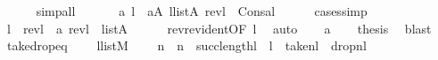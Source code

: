 \begin{isabellebody}
\ \ \ \ \isamarkupfalse%
\ simp{\isacharunderscore}{\kern0pt}all\isanewline
\ \ \isamarkupfalse%
\isanewline
\ \ \isamarkupfalse%
\ a\ l{\isacharprime}{\kern0pt}\ \ {\isachardoublequoteopen}a{\isasymin}A{\isachardoublequoteclose}\ {\isachardoublequoteopen}l{\isacharprime}{\kern0pt}{\isasymin}list{\isacharparenleft}{\kern0pt}A{\isacharparenright}{\kern0pt}{\isachardoublequoteclose}\ {\isachardoublequoteopen}rev{\isacharparenleft}{\kern0pt}l{\isacharparenright}{\kern0pt}\ {\isacharequal}{\kern0pt}\ Cons{\isacharparenleft}{\kern0pt}a{\isacharcomma}{\kern0pt}l{\isacharprime}{\kern0pt}{\isacharparenright}{\kern0pt}{\isachardoublequoteclose}\isanewline
\ \ \ \ \isamarkupfalse%
\ {\isacharparenleft}{\kern0pt}cases{\isacharsemicolon}{\kern0pt}simp{\isacharparenright}{\kern0pt}\isanewline
\ \ \isamarkupfalse%
\isanewline
\ \ \isamarkupfalse%
\ {\isachardoublequoteopen}l\ {\isacharequal}{\kern0pt}\ rev{\isacharparenleft}{\kern0pt}l{\isacharprime}{\kern0pt}{\isacharparenright}{\kern0pt}\ {\isacharat}{\kern0pt}\ {\isacharbrackleft}{\kern0pt}a{\isacharbrackright}{\kern0pt}{\isachardoublequoteclose}\ {\isachardoublequoteopen}rev{\isacharparenleft}{\kern0pt}l{\isacharprime}{\kern0pt}{\isacharparenright}{\kern0pt}\ {\isasymin}\ list{\isacharparenleft}{\kern0pt}A{\isacharparenright}{\kern0pt}{\isachardoublequoteclose}\isanewline
\ \ \ \ \isamarkupfalse%
\ rev{\isacharunderscore}{\kern0pt}rev{\isacharunderscore}{\kern0pt}ident{\isacharbrackleft}{\kern0pt}OF\ {\isacartoucheopen}l{\isasymin}{\isacharunderscore}{\kern0pt}{\isacartoucheclose}{\isacharbrackright}{\kern0pt}\ \isamarkupfalse%
\ auto\isanewline
\ \ \isamarkupfalse%
\ {\isacartoucheopen}a{\isasymin}{\isacharunderscore}{\kern0pt}{\isacartoucheclose}\isanewline
\ \ \isamarkupfalse%
\ {\isacharquery}{\kern0pt}thesis\ \isamarkupfalse%
\ blast\isanewline
{}\isamarkupfalse%
%
\endisatagproof
{\isafoldproof}%
%
\isadelimproof
\isanewline
%
\endisadelimproof
\isanewline
{}\isamarkupfalse%
\ take{\isacharunderscore}{\kern0pt}drop{\isacharunderscore}{\kern0pt}eq\ {\isacharcolon}{\kern0pt}\isanewline
\ \ \ {\isachardoublequoteopen}l{\isasymin}list{\isacharparenleft}{\kern0pt}M{\isacharparenright}{\kern0pt}{\isachardoublequoteclose}\isanewline
\ \ \ {\isachardoublequoteopen}{\isasymAnd}\ n\ {\isachardot}{\kern0pt}\ n\ {\isacharless}{\kern0pt}\ succ{\isacharparenleft}{\kern0pt}length{\isacharparenleft}{\kern0pt}l{\isacharparenright}{\kern0pt}{\isacharparenright}{\kern0pt}\ {\isasymLongrightarrow}\ l\ {\isacharequal}{\kern0pt}\ take{\isacharparenleft}{\kern0pt}n{\isacharcomma}{\kern0pt}l{\isacharparenright}{\kern0pt}\ {\isacharat}{\kern0pt}\ drop{\isacharparenleft}{\kern0pt}n{\isacharcomma}{\kern0pt}l{\isacharparenright}{\kern0pt}{\isachardoublequoteclose}\isanewline

\end{isabellebody}
